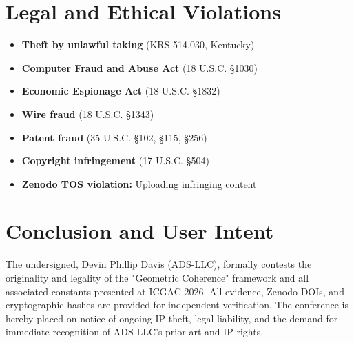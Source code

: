 \documentclass[12pt]{article}
\begin{document}
\section{Legal and Ethical Violations}
\begin{itemize}
  \item \textbf{Theft by unlawful taking} (KRS 514.030, Kentucky)
  \item \textbf{Computer Fraud and Abuse Act} (18 U.S.C. \S 1030)
  \item \textbf{Economic Espionage Act} (18 U.S.C. \S 1832)
  \item \textbf{Wire fraud} (18 U.S.C. \S 1343)
  \item \textbf{Patent fraud} (35 U.S.C. \S 102, \S 115, \S 256)
  \item \textbf{Copyright infringement} (17 U.S.C. \S 504)
  \item \textbf{Zenodo TOS violation:} Uploading infringing content
\end{itemize}

\section{Conclusion and User Intent}
The undersigned, Devin Phillip Davis (ADS-LLC), formally contests the originality and legality of the "Geometric Coherence" framework and all associated constants presented at ICGAC 2026. All evidence, Zenodo DOIs, and cryptographic hashes are provided for independent verification. The conference is hereby placed on notice of ongoing IP theft, legal liability, and the demand for immediate recognition of ADS-LLC's prior art and IP rights.
\end{document}

